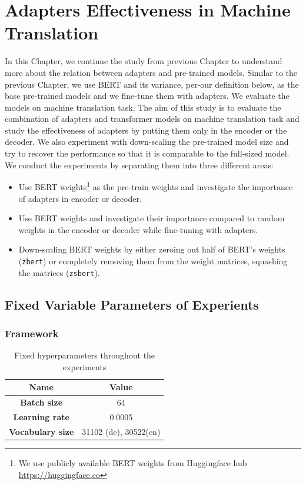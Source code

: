 
\chapter{Adapters Effectiveness in Machine Translation}
\label{chap:adaptefct}
In this Chapter, we continue the study from previous Chapter to understand more about the relation between adapters and pre-trained models. Similar to the previous Chapter, we use BERT and its variance, per-our definition below, as the base pre-trained models and we fine-tune them with adapters. We evaluate the models on machine translation task. The aim of this study is to evaluate the combination of adapters and transformer models on machine translation task and study the effectiveness of adapters by putting them only in the encoder or the decoder. We also experiment with down-scaling the pre-trained model size and try to recover the performance so that it is comparable to the full-sized model. We conduct the experiments by separating them into three different areas:
\begin{itemize}
    \item Use BERT weights\footnote{We use publicly available BERT weights from Huggingface hub \url{https://huggingface.co}} as the pre-train weights and investigate the importance of adapters in encoder or decoder.
    \item Use BERT weights and investigate their importance compared to random weights in the encoder or decoder while fine-tuning with adapters.
    \item Down-scaling BERT weights by either zeroing out half of BERT's weights (\texttt{zbert}) or completely removing them from the weight matrices, squashing the matrices (\texttt{zsbert}).
\end{itemize}

\section{Fixed Variable Parameters of Experients}
\subsection{Framework}
\begin{table}[]
    \centering
    \begin{tabular}{@{}cc@{}}
        \toprule
        \textbf{Name}            & \textbf{Value}        \\ \midrule
        \textbf{Batch size}      & 64                    \\
        \textbf{Learning rate}   & 0.0005                \\
        \textbf{Vocabulary size} & 31102 (de), 30522(en) \\ \bottomrule
    \end{tabular}
    \caption{Fixed hyperparameters throughout the experiments}
    \label{tab:hyp_invest}
\end{table}

